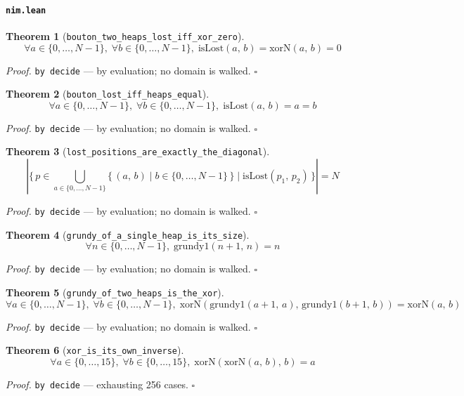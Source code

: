 \documentclass[11pt]{article}
\newtheorem{theorem}{Theorem}[section]
\begin{document}
\paragraph{\texttt{nim.lean}}

\begin{theorem}[\texttt{bouton\_two\_heaps\_lost\_iff\_xor\_zero}]
\[ \forall a \in \{0,\dots,N-1\},\; \forall b \in \{0,\dots,N-1\},\; \mathrm{isLost}\mathopen{}\left(a,\,b\right) = \mathrm{xorN}\mathopen{}\left(a,\,b\right) = 0 \]
\end{theorem}
\noindent\emph{Proof.} \texttt{by decide} --- by evaluation; no domain is walked. \hfill$\square$

\begin{theorem}[\texttt{bouton\_lost\_iff\_heaps\_equal}]
\[ \forall a \in \{0,\dots,N-1\},\; \forall b \in \{0,\dots,N-1\},\; \mathrm{isLost}\mathopen{}\left(a,\,b\right) = a = b \]
\end{theorem}
\noindent\emph{Proof.} \texttt{by decide} --- by evaluation; no domain is walked. \hfill$\square$

\begin{theorem}[\texttt{lost\_positions\_are\_exactly\_the\_diagonal}]
\[ \left|\{\, p \in \bigcup_{a \in \{0,\dots,N-1\}} \{\, \left(a,\,b\right) \mid b \in \{0,\dots,N-1\} \,\} \mid \mathrm{isLost}\mathopen{}\left(p_{1},\,p_{2}\right) \,\}\right| = N \]
\end{theorem}
\noindent\emph{Proof.} \texttt{by decide} --- by evaluation; no domain is walked. \hfill$\square$

\begin{theorem}[\texttt{grundy\_of\_a\_single\_heap\_is\_its\_size}]
\[ \forall n \in \{0,\dots,N-1\},\; \mathrm{grundy1}\mathopen{}\left(n + 1,\,n\right) = n \]
\end{theorem}
\noindent\emph{Proof.} \texttt{by decide} --- by evaluation; no domain is walked. \hfill$\square$

\begin{theorem}[\texttt{grundy\_of\_two\_heaps\_is\_the\_xor}]
\[ \forall a \in \{0,\dots,N-1\},\; \forall b \in \{0,\dots,N-1\},\; \mathrm{xorN}\mathopen{}\left(\mathrm{grundy1}\mathopen{}\left(a + 1,\,a\right),\,\mathrm{grundy1}\mathopen{}\left(b + 1,\,b\right)\right) = \mathrm{xorN}\mathopen{}\left(a,\,b\right) \]
\end{theorem}
\noindent\emph{Proof.} \texttt{by decide} --- by evaluation; no domain is walked. \hfill$\square$

\begin{theorem}[\texttt{xor\_is\_its\_own\_inverse}]
\[ \forall a \in \{0,\dots,15\},\; \forall b \in \{0,\dots,15\},\; \mathrm{xorN}\mathopen{}\left(\mathrm{xorN}\mathopen{}\left(a,\,b\right),\,b\right) = a \]
\end{theorem}
\noindent\emph{Proof.} \texttt{by decide} --- exhausting 256 cases. \hfill$\square$
\end{document}
